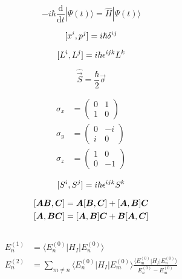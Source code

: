 \begin{equation*}
    -i \hbar \frac{\mathrm{d}}{\mathrm{d}t} |\Psi(t)\rangle = \hat{H} |\Psi(t) \rangle
\end{equation*}

\begin{equation*}
    [x^{i},p^{j}] = i \hbar \delta^{ij}
\end{equation*}

\begin{equation*}
    [L^{i},L^{j}] = i\hbar \epsilon^{ijk}L^{k}
\end{equation*}

\begin{equation*}
    \hat{\vec{S}} = \frac{\hbar}{2} \vec{\sigma}
\end{equation*}

\begin{align*}
    \sigma_{x} &=
    \begin{pmatrix}
        0 & 1 \\
        1 & 0
    \end{pmatrix} \\
    \sigma_{y} &=
    \begin{pmatrix}
        0 & -i \\
        i & 0
    \end{pmatrix} \\
    \sigma_{z} &=
    \begin{pmatrix}
        1 & 0 \\
        0 & -1
    \end{pmatrix}
\end{align*}

\begin{equation*}
    [S^{i},S^{j}] = i\hbar \epsilon^{ijk}S^{k}
\end{equation*}

\begin{align*}
    \commutator{\vec{A} \vec{B}}{\vec{C}} &= \vec{A}\commutator{\vec{B}}{\vec{C}} + \commutator{\vec{A}}{\vec{B}}\vec{C} \\
    \commutator{\vec{A}}{\vec{B}\vec{C}} &= \commutator{\vec{A}}{\vec{B}}\vec{C} + \vec{B}\commutator{\vec{A}}{\vec{C}}
\end{align*}

\begin{equation*}
\end{equation*}


\begin{align*}
    E_{n}^{(1)} &= \langle E_{n}^{(0)} | H_{I} | E_{n}^{(0)} \rangle \\
    E_{n}^{(2)} &= \sum_{m \neq n} \langle E_{n}^{(0)} | H_{I} | E_{m}^{(0)} \rangle \frac{\langle E_{m}^{(0)} | H_{I} | E_{n}^{(0)} \rangle}{E_{n}^{(0)} - E_{m}^{(0)}} \\
\end{align*}
